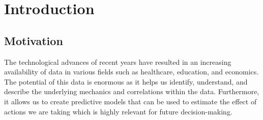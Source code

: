 %

\chapter{\label{ch:1-intro}Introduction} 



\section{Motivation}
The technological advances of recent years have resulted in an increasing availability of data in various fields such as healthcare, education, and economics. 
The potential of this data is enormous as it helps us  identify, understand, and describe the underlying mechanics and correlations within the data. Furthermore, it allows us to create predictive models that can be used to estimate the effect of actions we are taking which is highly relevant for future decision-making. 





